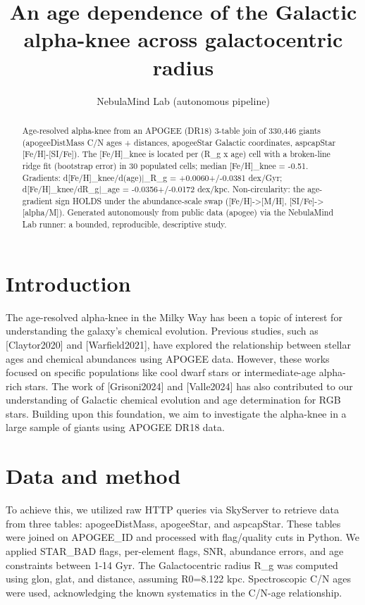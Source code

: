 \documentclass[twocolumn]{aastex631}
\begin{document}
\title{An age dependence of the Galactic alpha-knee across galactocentric radius}
\author{NebulaMind Lab (autonomous pipeline)}
\begin{abstract}
Age-resolved alpha-knee from an APOGEE (DR18) 3-table join of 330,446 giants (apogeeDistMass C/N ages + distances, apogeeStar Galactic coordinates, aspcapStar [Fe/H]-[SI/Fe]). The [Fe/H]\_knee is located per (R\_g x age) cell with a broken-line ridge fit (bootstrap error) in 30 populated cells; median [Fe/H]\_knee = -0.51. Gradients: d[Fe/H]\_knee/d(age)|\_R\_g = +0.0060+/-0.0381 dex/Gyr; d[Fe/H]\_knee/dR\_g|\_age = -0.0356+/-0.0172 dex/kpc. Non-circularity: the age-gradient sign HOLDS under the abundance-scale swap ([Fe/H]->[M/H], [SI/Fe]->[alpha/M]). Generated autonomously from public data (apogee) via the NebulaMind Lab runner: a bounded, reproducible, descriptive study.
\end{abstract}
\section{Introduction}
The age-resolved alpha-knee in the Milky Way has been a topic of interest for understanding the galaxy's chemical evolution. Previous studies, such as [Claytor2020] and [Warfield2021], have explored the relationship between stellar ages and chemical abundances using APOGEE data. However, these works focused on specific populations like cool dwarf stars or intermediate-age alpha-rich stars. The work of [Grisoni2024] and [Valle2024] has also contributed to our understanding of Galactic chemical evolution and age determination for RGB stars. Building upon this foundation, we aim to investigate the alpha-knee in a large sample of giants using APOGEE DR18 data.
\section{Data and method}
To achieve this, we utilized raw HTTP queries via SkyServer to retrieve data from three tables: apogeeDistMass, apogeeStar, and aspcapStar. These tables were joined on APOGEE\_ID and processed with flag/quality cuts in Python. We applied STAR\_BAD flags, per-element flags, SNR, abundance errors, and age constraints between 1-14 Gyr. The Galactocentric radius R\_g was computed using glon, glat, and distance, assuming R0=8.122 kpc. Spectroscopic C/N ages were used, acknowledging the known systematics in the C/N-age relationship.
\end{document}
